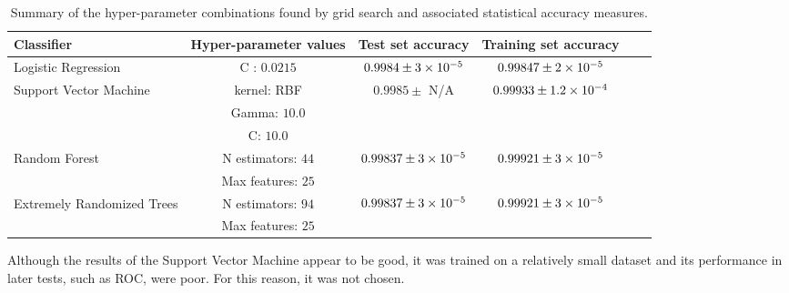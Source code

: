 \begin{table}
    \centering
    \tiny
    \begin{tabular}{p{} c c c c c}
        Classifier                                  & Hyper-parameter values    & Test set accuracy     & Training set accuracy          \\
        \hline
        Logistic Regression                         & C : $0.0215$              & $0.9984 \pm 3\times 10^{-5}$  & $0.99847 \pm 2\times 10^{-5}$ \\
        \multirow{3}{*}{\parbox{0.2\textwidth}{Support Vector Machine}}     & kernel: \ac{RBF}               & \multirow{3}{*}{$0.9985 \pm$ N/A}    & \multirow{3}{*}{$0.99933 \pm 1.2\times 10^{-4}$} \\
                                                    & Gamma: $10.0$             &                           &                               &                               &       \\
                                                    & C: $10.0$                 &                           &                               &                               &       \\
        \multirow{2}{*}{\parbox{0.2\textwidth}{Random Forest}}              & N estimators: $44$        & \multirow{2}{*}{$0.99837 \pm 3\times 10^{-5}$} & \multirow{2}{*}{$0.99921 \pm 3\times 10^{-5}$} \\
                                                    & Max features: $25$        &                           &                               &                               &       \\
        \multirow{2}{*}{\parbox{0.2\textwidth}{Extremely Randomized Trees}} & N estimators: $94$        & \multirow{2}{*}{$0.99837 \pm 3\times 10^{-5}$} & \multirow{2}{*}{$0.99921 \pm 3\times 10^{-5}$} \\
                                                    & Max features: $25$        &                           &                               &                               &       \\
    \end{tabular}
    \caption{Summary of the hyper-parameter combinations found by grid search and associated statistical accuracy measures.}
    \label{tab:gridresults}
\end{table}

Although the results of the Support Vector Machine appear to be good, it was trained on a relatively small dataset and its performance in later tests, such as \ac{ROC}, were poor.
For this reason, it was not chosen.

